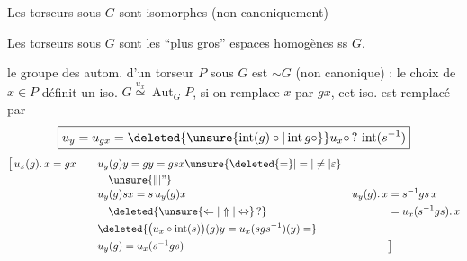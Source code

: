
Les torseurs sous $G$ sont isomorphes (non canoniquement)

Les torseurs sous $G$ sont les ``plus gros'' espaces homogènes ss $G$.

le groupe des autom. d'un torseur $P$ sous $G$ est $\sim G$ (non canonique) : le choix de $x\in P$ définit un iso. $G\overset{u_x}{\simeq}\operatorname{Aut}_{G}P$, si on remplace $x$ par $gx$, cet iso. est remplacé par
\[
\boxed{u_y=u_{gx}=\deleted{\unsure{\operatorname{int}(g)\circ|\operatorname{int}g\circ}}u_x\circ\,?\,\operatorname{int}(s^{-1})}
\]
{\small
\[
\begin{aligned}
\bigl[\,u_x(g).\,x=gx\qquad &u_y(g)y=gy=gsx\unsure{\deleted{=}|=|\ne|\varepsilon} &&\\
&\quad\unsure{\Vert|\text{''}} &&\\[-3pt]
&u_y(g)sx=s\,u_y(g)x\qquad &u_y(g).\,x&=s^{-1}gs\,x\\
&\quad\deleted{\unsure{\Leftarrow|\Uparrow|\Leftrightarrow}\,?} &&=u_x(s^{-1}gs).\,x\\
&\deleted{\bigl(u_x\circ\operatorname{int}(s)\bigr)(g)y=u_x(sgs^{-1})(y)=} &&\\
&u_y(g)=u_x(s^{-1}gs) &&\bigr]
\end{aligned}
\]}
